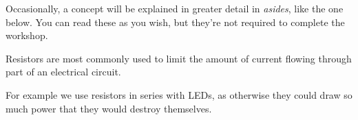 Occasionally, a concept will be explained in greater detail in \textit{asides}, like the one below. You can read these as you wish, but they're not required to complete the workshop.
	
\begin{aside}[Resistors]
	Resistors are most commonly used to limit the amount of current flowing through part of an electrical circuit.
	
	For example we use resistors in series with LEDs, as otherwise they could draw so much power that they would destroy themselves.
	
\end{aside}
